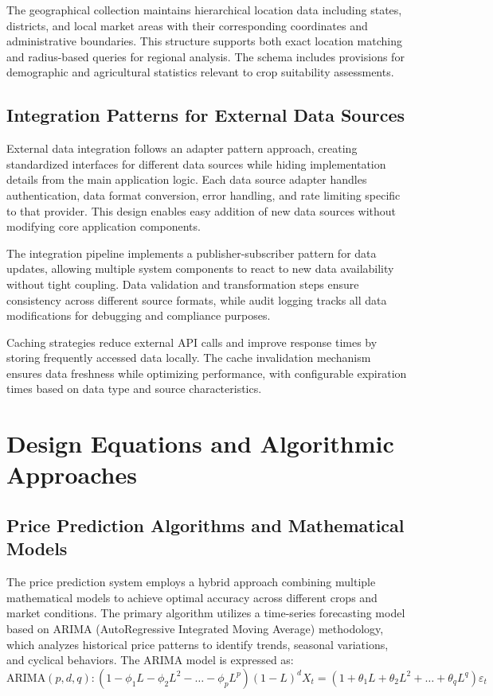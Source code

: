 The geographical collection maintains hierarchical location data including states, districts, and local market areas with their corresponding coordinates and administrative boundaries. This structure supports both exact location matching and radius-based queries for regional analysis. The schema includes provisions for demographic and agricultural statistics relevant to crop suitability assessments.

\subsection{Integration Patterns for External Data Sources}

External data integration follows an adapter pattern approach, creating standardized interfaces for different data sources while hiding implementation details from the main application logic. Each data source adapter handles authentication, data format conversion, error handling, and rate limiting specific to that provider. This design enables easy addition of new data sources without modifying core application components.

The integration pipeline implements a publisher-subscriber pattern for data updates, allowing multiple system components to react to new data availability without tight coupling. Data validation and transformation steps ensure consistency across different source formats, while audit logging tracks all data modifications for debugging and compliance purposes.

Caching strategies reduce external API calls and improve response times by storing frequently accessed data locally. The cache invalidation mechanism ensures data freshness while optimizing performance, with configurable expiration times based on data type and source characteristics.

\section{Design Equations and Algorithmic Approaches}

\subsection{Price Prediction Algorithms and Mathematical Models}

The price prediction system employs a hybrid approach combining multiple mathematical models to achieve optimal accuracy across different crops and market conditions. The primary algorithm utilizes a time-series forecasting model based on ARIMA (AutoRegressive Integrated Moving Average) methodology, which analyzes historical price patterns to identify trends, seasonal variations, and cyclical behaviors. The ARIMA model is expressed as:
\begin{equation}
\text{ARIMA}(p,d,q): (1 - \phi_1L - \phi_2L^2 - \ldots - \phi_pL^p)(1-L)^dX_t = (1 + \theta_1L + \theta_2L^2 + \ldots + \theta_qL^q)\varepsilon_t
\end{equation}

